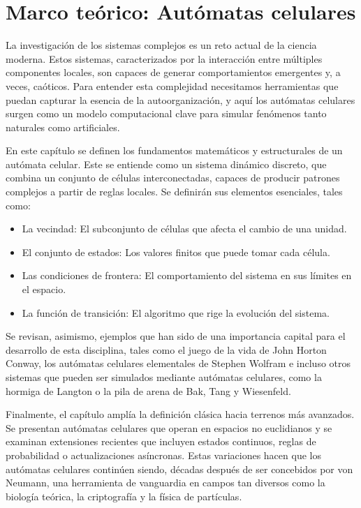 \chapter{Marco teórico: Autómatas celulares}
\label{chapter:automatas_celulares}

La investigación de los sistemas complejos es un reto actual de la ciencia moderna. Estos sistemas, caracterizados por la interacción entre múltiples componentes locales, son capaces de generar comportamientos emergentes y, a veces, caóticos. Para entender esta complejidad necesitamos herramientas que puedan capturar la esencia de la autoorganización, y aquí los autómatas celulares surgen como un modelo computacional clave para simular fenómenos tanto naturales como artificiales.

En este capítulo se definen los fundamentos matemáticos y estructurales de un autómata celular. Este se entiende como un sistema dinámico discreto, que combina un conjunto de células interconectadas, capaces de producir patrones complejos a partir de reglas locales. Se definirán sus elementos esenciales, tales como:

\begin{itemize}
	
	\item La vecindad: El subconjunto de células que afecta el cambio de una unidad.
	
	\item El conjunto de estados: Los valores finitos que puede tomar cada célula.
	
	\item Las condiciones de frontera: El comportamiento del sistema en sus límites en el espacio.
	
	\item La función de transición: El algoritmo que rige la evolución del sistema.
	
\end{itemize}

Se revisan, asimismo, ejemplos que han sido de una importancia capital para el desarrollo de esta disciplina, tales como el juego de la vida de John Horton Conway, los autómatas celulares elementales de Stephen Wolfram e incluso otros sistemas que pueden ser simulados mediante autómatas celulares, como la hormiga de Langton o la pila de arena de Bak, Tang y Wiesenfeld.

Finalmente, el capítulo amplía la definición clásica hacia terrenos más avanzados. Se presentan autómatas celulares que operan en espacios no euclidianos y se examinan extensiones recientes que incluyen estados continuos, reglas de probabilidad o actualizaciones asíncronas. Estas variaciones hacen que los autómatas celulares continúen siendo, décadas después de ser concebidos por von Neumann, una herramienta de vanguardia en campos tan diversos como la biología teórica, la criptografía y la física de partículas.


